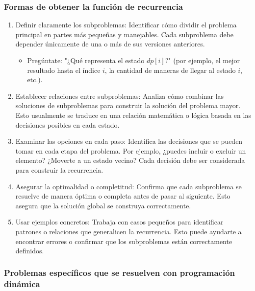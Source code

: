 \subsubsection{Formas de obtener la función de recurrencia}

\begin{enumerate} 
  \item Definir claramente los subproblemas: Identificar cómo dividir el problema principal en partes más pequeñas y manejables. Cada subproblema debe depender únicamente de una o más de sus versiones anteriores. 
  \begin{itemize} 
    \item Pregúntate: "¿Qué representa el estado $dp[i]$?" (por ejemplo, el mejor resultado hasta el índice $i$, la cantidad de maneras de llegar al estado $i$, etc.). 
  \end{itemize} 
  \item Establecer relaciones entre subproblemas: Analiza cómo combinar las soluciones de subproblemas para construir la solución del problema mayor. Esto usualmente se traduce en una relación matemática o lógica basada en las decisiones posibles en cada estado. 
  \item Examinar las opciones en cada paso: Identifica las decisiones que se pueden tomar en cada etapa del problema. Por ejemplo, ¿puedes incluir o excluir un elemento? ¿Moverte a un estado vecino? Cada decisión debe ser considerada para construir la recurrencia. 
  \item Asegurar la optimalidad o completitud: Confirma que cada subproblema se resuelve de manera óptima o completa antes de pasar al siguiente. Esto asegura que la solución global se construya correctamente. 
  \item Usar ejemplos concretos: Trabaja con casos pequeños para identificar patrones o relaciones que generalicen la recurrencia. Esto puede ayudarte a encontrar errores o confirmar que los subproblemas están correctamente definidos. 
\end{enumerate}

\subsubsection{Problemas específicos que se resuelven con programación dinámica}

